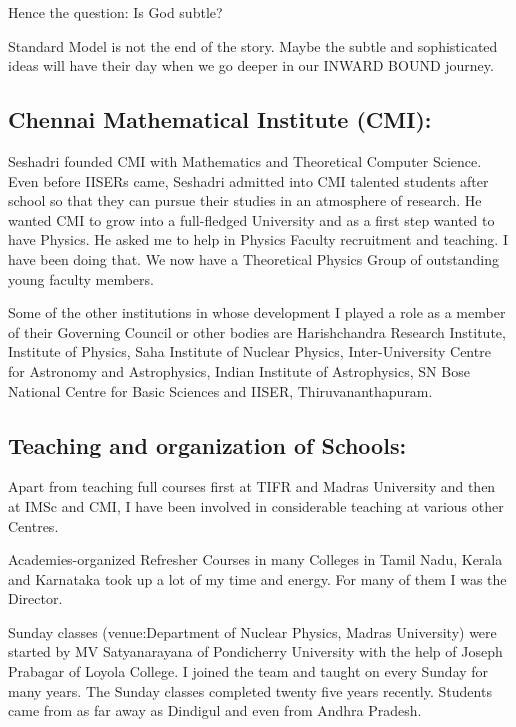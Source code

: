 Hence the question: Is God subtle?


Standard Model is not the end of the story. Maybe the subtle and 
sophisticated ideas will have their day when we go deeper in our INWARD 
BOUND journey.

\subsection*{Chennai Mathematical Institute (CMI):}

Seshadri founded CMI with Mathematics and Theoretical Computer Science. 
Even before IISERs came, Seshadri admitted into CMI talented students 
after school so that they can pursue their studies in an atmosphere of 
research. He wanted CMI to grow into a full-fledged University and as a 
first step wanted to have Physics. He asked me to help in Physics 
Faculty recruitment and teaching. I have been doing that. We now have a 
Theoretical Physics Group of outstanding young faculty members.

\newpage

Some of the other institutions in whose development I pla\-yed a role as a 
member of their Governing Council or other bo\-dies are Harishchandra 
Research Institute, Institute of Physics, Saha Institute of Nuclear 
Physics, Inter-University Centre for Astro\-nomy and Astrophysics, Indian 
Institute of Astrophysics, SN Bose National Centre for Basic Sciences 
and IISER, Thiruva\-nanthapuram.
\vspace{-\topsep}
\subsection*{Teaching and organization of Schools:}

Apart from teaching full courses first at TIFR and Madras
Univer\-sity and then at IMSc and CMI, I have been involved in
conside\-rable teaching at various other Centres.


Academies-organized Refresher Courses in many Colleges in
Tamil Nadu, Kerala and Karnataka took up a lot of my time and
energy. For many of them I was the Director.


Sunday classes (venue:Department of Nuclear Physics, Mad\-ras University) 
were started by MV Satyanarayana of Pondiche\-rry University with the 
help of Joseph Prabagar of Loyola Colle\-ge. I joined the team and taught 
on every Sunday for many years. The Sunday classes completed twenty 
five years recently. Students came from as far away as Dindigul and 
even from Andhra Pradesh.


